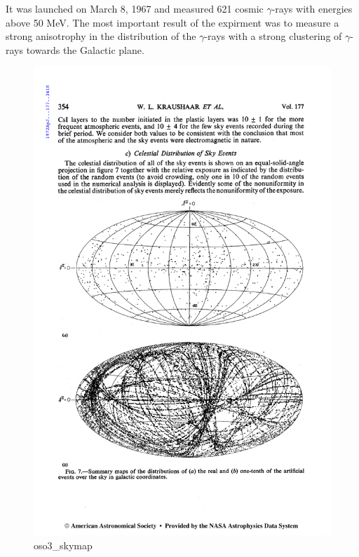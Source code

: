 It was launched on March 8, 1967 and measured
621 cosmic $\gamma$-rays with energies above 50 MeV.
The most important result of the expirment was to
measure a strong anisotrophy in the distribution of 
the $\gamma$-rays with a strong clustering of 
$\gamma$-rays towards the Galactic plane.

\begin{figure}[p]
\includegraphics{chapters/introduction/figures/kraushaar_et_al_1972_skymap.pdf}
\caption{oso3_skymap}

\end{figure}




